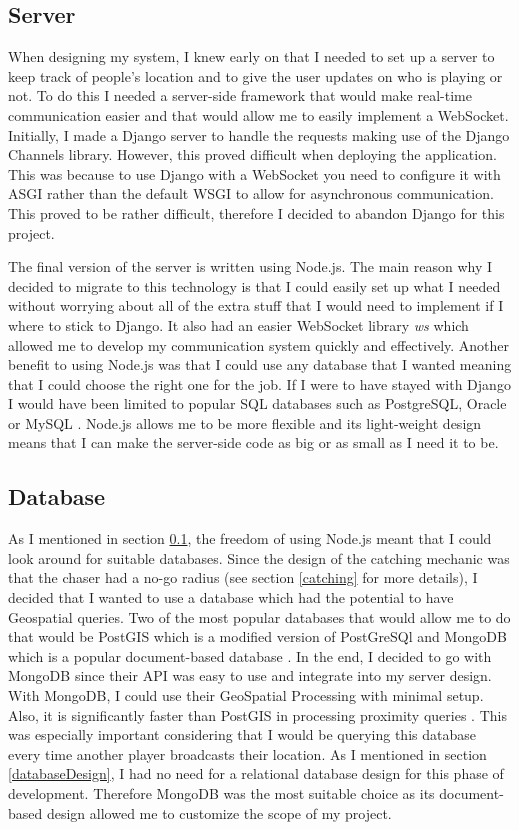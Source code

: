 \documentclass{l4proj}
\begin{document}
\subsection{Server}
\label{implementationServer}
When designing my system, I knew early on that I needed to set up a server to keep track of people's location
and to give the user updates on who is playing or not. To do this I needed a server-side framework that would make real-time communication easier and that would allow me to easily implement a WebSocket. Initially, I made a Django server to
handle the requests making use of the Django Channels library. However, this proved difficult when deploying the application.
This was because to use Django with a WebSocket you need to configure it with ASGI rather than the default WSGI
to allow for asynchronous communication. This proved to be rather difficult, therefore I decided to abandon Django for this
project.

The final version of the server is written using Node.js. The main reason why I decided to migrate to this technology is that
I could easily set up what I needed without worrying about all of the extra stuff that I would need to implement if I where to
stick to Django. It also had an easier WebSocket library \emph{ws} which allowed me to develop my communication system quickly
and effectively. Another benefit to using Node.js was that I could use any database that I wanted meaning that I could
choose the right one for the job. If I were to have stayed with Django I would have been limited to popular SQL databases
such as PostgreSQL, Oracle or MySQL \citep{djangoDatabases}. Node.js allows me to be more flexible and its light-weight
design means that I can make the server-side code as big or as small as I need it to be.

\subsection{Database}
\label{implementationDatabase}
As I mentioned in section \ref{implementationServer}, the freedom of using Node.js meant that I could look
around for suitable databases. Since the design of the catching mechanic was that the chaser had a no-go radius (see section
\ref{catching} for more details), I decided that I wanted to use a database which had the potential to have Geospatial queries.
Two of the most popular databases that would allow me to do that would be PostGIS which is a modified version of PostGreSQl \citep{postgis, postgres} and
MongoDB which is a popular document-based database \citep{mongodb}. In the end, I decided to go with MongoDB since their API
was easy to use and integrate into my server design. With MongoDB, I could use their GeoSpatial Processing with minimal setup. Also, it is significantly
faster than PostGIS in processing proximity queries \citep{Bartoszewski2019}. This was especially important considering
that I would be querying this database every time another player broadcasts their location. As I mentioned in section
\ref{databaseDesign}, I had no need for a relational database design for this phase of development. Therefore MongoDB
was the most suitable choice as its document-based design allowed me to customize the scope of my project. 
\end{document}
